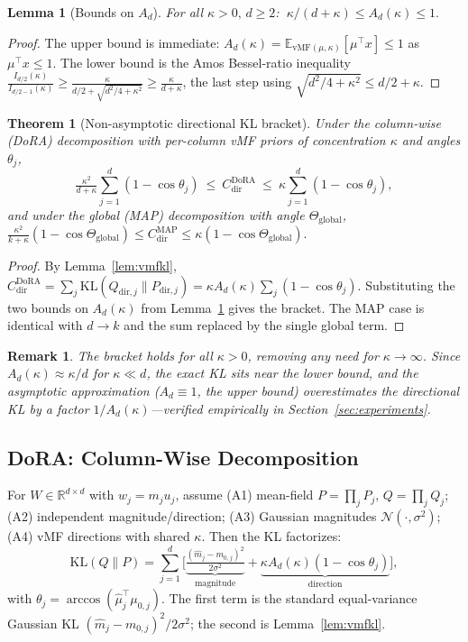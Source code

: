 \documentclass[11pt]{article}
\newtheorem{theorem}{Theorem}
\newtheorem{lemma}{Lemma}
\newtheorem{remark}{Remark}
\newcommand{\KL}{\mathrm{KL}}
\newcommand{\vMF}{\mathrm{vMF}}
\newcommand{\Thetaglob}{\Theta_{\mathrm{global}}}
\newcommand{\E}{\mathbb{E}}
\newcommand{\R}{\mathbb{R}}
\begin{document}
\begin{lemma}[Bounds on $A_d$]\label{lem:adbounds}
For all $\kappa>0,\,d\ge2$: $\ \kappa/(d+\kappa)\le A_d(\kappa)\le1.$
\end{lemma}
\begin{proof}
The upper bound is immediate: $A_d(\kappa)=\E_{\vMF(\mu,\kappa)}[\mu^\top x]\le1$ as
$\mu^\top x\le1$. The lower bound is the Amos Bessel-ratio inequality~\cite{amos}
$\tfrac{I_{d/2}(\kappa)}{I_{d/2-1}(\kappa)}\ge\tfrac{\kappa}{d/2+\sqrt{d^2/4+\kappa^2}}\ge\tfrac{\kappa}{d+\kappa}$,
the last step using $\sqrt{d^2/4+\kappa^2}\le d/2+\kappa$.
\end{proof}

\begin{theorem}[Non-asymptotic directional KL bracket]\label{thm:nonasym}
Under the column-wise (DoRA) decomposition with per-column vMF priors of
concentration $\kappa$ and angles $\theta_j$,
\[
\tfrac{\kappa^2}{d+\kappa}\textstyle\sum_{j=1}^d(1-\cos\theta_j)
\ \le\ C^{\mathrm{DoRA}}_{\mathrm{dir}}
\ \le\ \kappa\textstyle\sum_{j=1}^d(1-\cos\theta_j),
\]
and under the global (MAP) decomposition with angle $\Thetaglob$,
$\frac{\kappa^2}{k+\kappa}(1-\cos\Thetaglob)\le C^{\mathrm{MAP}}_{\mathrm{dir}}
\le\kappa(1-\cos\Thetaglob).$
\end{theorem}
\begin{proof}
By Lemma~\ref{lem:vmfkl}, $C^{\mathrm{DoRA}}_{\mathrm{dir}}=\sum_j\KL(Q_{\mathrm{dir},j}\|P_{\mathrm{dir},j})
=\kappa A_d(\kappa)\sum_j(1-\cos\theta_j)$. Substituting the two bounds on $A_d(\kappa)$
from Lemma~\ref{lem:adbounds} gives the bracket. The MAP case is identical with $d\!\to\!k$
and the sum replaced by the single global term.
\end{proof}

\begin{remark}
The bracket holds for all $\kappa>0$, removing any need for $\kappa\to\infty$. Since
$A_d(\kappa)\approx\kappa/d$ for $\kappa\ll d$, the exact KL sits near the lower bound,
and the asymptotic approximation ($A_d\!\equiv\!1$, the upper bound) overestimates the
directional KL by a factor $1/A_d(\kappa)$---verified empirically in
Section~\ref{sec:experiments}.
\end{remark}

\subsection{DoRA: Column-Wise Decomposition}
For $W\in\R^{d\times d}$ with $w_j=m_j u_j$, assume (A1) mean-field
$P=\prod_j P_j,\,Q=\prod_j Q_j$; (A2) independent magnitude/direction; (A3) Gaussian
magnitudes $\mathcal{N}(\cdot,\sigma^2)$; (A4) vMF directions with shared $\kappa$.
Then the KL factorizes:
\begin{equation}\label{eq:kldecomp}
\KL(Q\|P)=\sum_{j=1}^d\Big[\underbrace{\tfrac{(\hat m_j-m_{0,j})^2}{2\sigma^2}}_{\text{magnitude}}
+\underbrace{\kappa A_d(\kappa)(1-\cos\theta_j)}_{\text{direction}}\Big],
\end{equation}
with $\theta_j=\arccos(\hat\mu_j^\top\mu_{0,j})$. The first term is the standard
equal-variance Gaussian KL $(\hat m_j-m_{0,j})^2/2\sigma^2$; the second is
Lemma~\ref{lem:vmfkl}.
\end{document}
